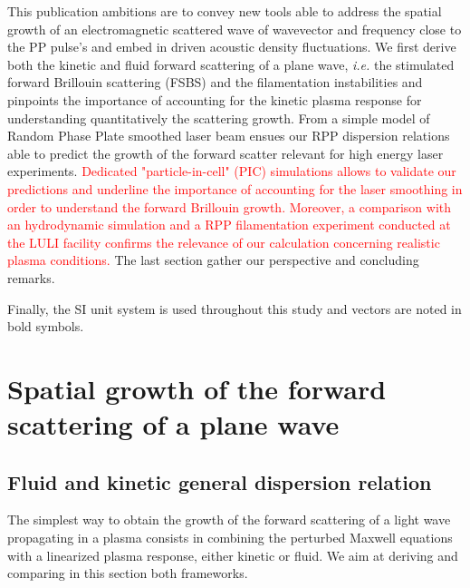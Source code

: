 \documentclass[
 reprint,
 amsmath,amssymb,
 aps,
]{revtex4-1}
\begin{document}
This publication ambitions are to convey new tools 
able to address  the spatial growth of an electromagnetic scattered wave of wavevector and frequency close to the PP pulse's and embed in driven acoustic density fluctuations.
We first derive both the kinetic and fluid forward scattering of a plane wave, \emph{i.e.} the  stimulated forward Brillouin scattering (FSBS) and the filamentation instabilities and pinpoints the importance of accounting for the kinetic plasma response for understanding quantitatively the scattering growth.
From  a simple model of Random Phase Plate smoothed laser beam ensues our RPP dispersion relations  able to predict the growth of the forward scatter relevant for high energy laser experiments. 
\textcolor{red}{Dedicated "particle-in-cell" (PIC) simulations allows to validate our predictions and underline the importance of accounting for the laser smoothing in order to understand the forward Brillouin growth. 
Moreover, a comparison with an hydrodynamic simulation and a RPP filamentation experiment conducted at the LULI facility confirms the relevance of our calculation concerning realistic plasma conditions.} 
The last section gather our perspective and concluding remarks. 

Finally, the SI unit system is used throughout this study and vectors are noted in bold symbols. 

\section{Spatial growth of the  forward scattering of a plane wave}\label{sec:plane}
\subsection{Fluid and kinetic general dispersion relation}
The simplest way to obtain the growth of the forward scattering of a light wave propagating in a plasma consists  in combining the perturbed Maxwell equations with a linearized plasma response, either kinetic or fluid.
We aim at deriving and comparing in this section both frameworks.
\end{document}
